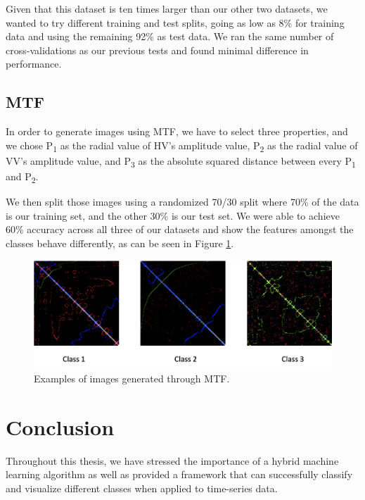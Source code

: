 \documentclass{turabian-thesis}
\begin{document}
Given that this dataset is ten times larger than our other two datasets, we wanted to try different training and test splits, going as low as 8\% for training data and using the remaining 92\% as test data. We ran the same number of cross-validations as our previous tests and found minimal difference in performance.



\section{ MTF }
 
In order to generate images using MTF, we have to select three properties, and we chose P\textsubscript{1} as the radial value of HV's amplitude value, P\textsubscript{2} as the radial value of VV's amplitude value, and P\textsubscript{3} as the absolute squared distance between every P\textsubscript{1} and P\textsubscript{2}. 

We then split those images using a randomized 70/30 split where 70\% of the data is our training set, and the other 30\% is our test set. We were able to achieve 60\% accuracy across all three of our datasets and show the features amongst the classes behave differently, as can be seen in Figure \ref{fig:whitebox_images}.

\begin{figure}[h!]
   \begin{center}
      \includegraphics[scale=0.5]{../media/whitebox_images.png}
   \end{center}
   \caption{Examples of images generated through MTF.}
   \label{fig:whitebox_images}
\end{figure}


\chapter{Conclusion}
\label{chap:conclusion}
Throughout this thesis, we have stressed the importance of a hybrid machine learning algorithm as well as provided a framework that can successfully classify and visualize different classes when applied to time-series data. 
\end{document}
